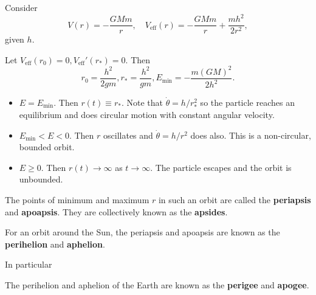 \begin{example}
    Consider 
    \[
        V(r) = -\frac{GMm}{r},\quad V_{\text{eff}}(r) = -\frac{GMm}{r}+\frac{mh^2}{2r^2},
    \]
    given $h$.
    \begin{center}
    \end{center}
    Let $ V_{\text{eff}}(r_0)=0, V_{\text{eff}}'(r_{*})=0 $. Then
    \[
        r_0=\frac{h^2}{2gm},r_*=\frac{h^2}{gm}, E_{\text{min}}=-\frac{m(GM)^2}{2h^2} .
    \]
    \begin{itemize}
        \item $ E=E_{\text{min}} $. Then $ r(t)\equiv r_* $. Note that $ \dot{\theta} = h/r_*^2 $ so the particle reaches an equilibrium and does circular motion with constant angular velocity.
        \item $E_{\min} < E < 0$. Then $r$ oscillates and $\dot{\theta}=h/r^2$ does also. This is a non-circular, bounded orbit.
        \item $E \geq 0$. Then $ r(t)\to \infty $ as $ t\to \infty  $. The particle escapes and the orbit is unbounded.
    \end{itemize}
\end{example}


\begin{definition}
    The points of minimum and maximum $r$ in such an orbit are called the \textbf{periapsis} and \textbf{apoapsis}. They are collectively known as the \textbf{apsides}.
\end{definition}

\begin{definition}
For an orbit around the Sun, the periapsis and apoapsis are known as the \textbf{perihelion} and \textbf{aphelion}.
\end{definition}

In particular
\begin{definition}
The perihelion and aphelion of the Earth are known as the \textbf{perigee} and \textbf{apogee}.
\end{definition}

